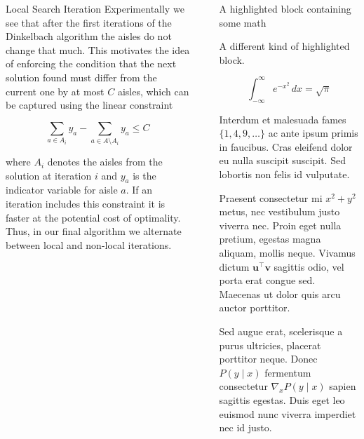 \documentclass[final]{beamer}
\newlength{\sepwidth}
\newlength{\colwidth}
\newcommand{\separatorcolumn}{\begin{column}{\sepwidth}\end{column}}
\begin{document}
\begin{frame}[t]
\begin{columns}[t]
\begin{column}{\colwidth}
\begin{block}{Local Search Iteration}
    Experimentally we see that after the first iterations of the Dinkelbach algorithm the aisles do not change that much. This motivates the idea of
    enforcing the condition that the next solution found must differ from the current one by at most $C$ aisles, which can be captured using the linear constraint
    
    \[
    \sum_{a \in A_i} y_a - \sum_{a \in A \setminus A_i} y_a \leq C
    \]

    where $A_i$ denotes the aisles from the solution at iteration $i$ and $y_a$ is the indicator variable for aisle $a$. If an iteration includes this constraint it is faster at the potential cost of optimality. Thus, in our final algorithm we alternate between local and non-local iterations.
  
  \end{block}

\end{column}

\separatorcolumn

\begin{column}{\colwidth}

  \begin{exampleblock}{A highlighted block containing some math}

    A different kind of highlighted block.

    $$
    \int_{-\infty}^{\infty} e^{-x^2}\,dx = \sqrt{\pi}
    $$

    Interdum et malesuada fames $\{1, 4, 9, \ldots\}$ ac ante ipsum primis in
    faucibus. Cras eleifend dolor eu nulla suscipit suscipit. Sed lobortis non
    felis id vulputate.


    Praesent consectetur mi $x^2 + y^2$ metus, nec vestibulum justo viverra
    nec. Proin eget nulla pretium, egestas magna aliquam, mollis neque. Vivamus
    dictum $\mathbf{u}^\intercal\mathbf{v}$ sagittis odio, vel porta erat
    congue sed. Maecenas ut dolor quis arcu auctor porttitor.


    Sed augue erat, scelerisque a purus ultricies, placerat porttitor neque.
    Donec $P(y \mid x)$ fermentum consectetur $\nabla_x P(y \mid x)$ sapien
    sagittis egestas. Duis eget leo euismod nunc viverra imperdiet nec id
    justo.

  \end{exampleblock}


\end{column}
\end{columns}
\end{frame}
\end{document}
